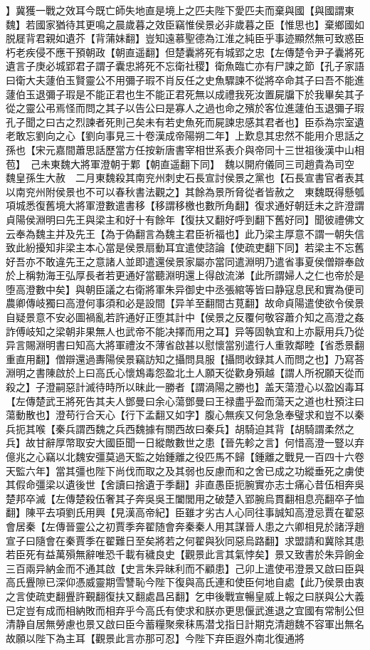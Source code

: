 】冀獲一戰之效耳今既亡師失地直是境上之匹夫陛下愛匹夫而棄與國【與國謂東魏】若國家猶待其更鳴之晨歲暮之效臣竊惟侯景必非歲暮之臣【惟思也】棄鄉國如脱屣背君親如遺芥【背蒲妹翻】豈知遠慕聖德為江淮之純臣乎事迹顯然無可致惑臣朽老疾侵不應干預朝政【朝直遥翻】但楚囊將死有城郢之忠【左傳楚令尹子囊將死遺言子庚必城郢君子謂子囊忠將死不忘衛社稷】衛魚臨亡亦有尸諫之節【孔子家語曰衛大夫蘧伯玉賢靈公不用彌子瑕不肖反任之史魚驟諫不從將卒命其子曰吾不能進蘧伯玉退彌子瑕是不能正君也生不能正君死無以成禮我死汝置屍牖下於我畢矣其子從之靈公弔焉怪而問之其子以告公曰是寡人之過也命之殯於客位進蘧伯玉退彌子瑕孔子聞之曰古之烈諫者死則己矣未有若史魚死而屍諫忠感其君者也】臣忝為宗室遺老敢忘劉向之心【劉向事見三十卷漢成帝陽朔二年】上歎息其忠然不能用介思話之孫也【宋元嘉間蕭思話歷當方任按新唐書宰相世系表介與帝同十三世祖後漢中山相苞】　己未東魏大將軍澄朝于鄴【朝直遥翻下同】　魏以開府儀同三司趙貴為司空　魏皇孫生大赦　二月東魏殺其南兖州刺史石長宣討侯景之黨也【石長宣書官者表其以南兖州附侯景也不可以春秋書法觀之】其餘為景所脅從者皆赦之　東魏既得懸瓠項城悉復舊境大將軍澄數遣書移【移謂移檄也數所角翻】復求通好朝廷未之許澄謂貞陽侯淵明曰先王與梁主和好十有餘年【復扶又翻好呼到翻下舊好同】聞彼禮佛文云奉為魏主并及先王【為于偽翻言為魏主君臣祈福也】此乃梁主厚意不謂一朝失信致此紛擾知非梁主本心當是侯景扇動耳宜遣使諮論【使疏吏翻下同】若梁主不忘舊好吾亦不敢違先王之意諸人並即遣還侯景家屬亦當同遣淵明乃遣省事夏侯僧辯奉啟於上稱勃海王弘厚長者若更通好當聽淵明還上得啟流涕【此所謂婦人之仁也帝於是堕高澄數中矣】與朝臣議之右衛將軍朱异御史中丞張綰等皆曰静寇息民和實為便司農卿傳岐獨曰高澄何事須和必是設間【异羊至翻間古莧翻】故命貞陽遣使欲令侯景自疑景意不安必圖禍亂若許通好正堕其計中【侯景之反覆何敬容蕭介知之高澄之姦詐傅岐知之梁朝非果無人也武帝不能决擇而用之耳】异等固執宜和上亦厭用兵乃從异言賜淵明書曰知高大將軍禮汝不薄省啟甚以慰懷當别遣行人重敦鄰睦【省悉景翻重直用翻】僧辯還過夀陽侯景竊訪知之攝問具服【攝問收録其人而問之也】乃寫荅淵明之書陳啟於上曰高氏心懷鴆毒怨盈北土人願天從歡身殞越【謂人所祝願天從而殺之】子澄嗣惡計滅待時所以昧此一勝者【謂渦陽之勝也】盖天蕩澄心以盈凶毒耳【左傳楚武王將死告其夫人鄧曼曰余心蕩鄧曼曰王禄盡乎盈而蕩天之道也杜預注曰蕩動散也】澄苟行合天心【行下孟翻又如字】腹心無疾又何急急奉璧求和豈不以秦兵扼其喉【秦兵謂西魏之兵西魏據有關西故曰秦兵】胡騎迫其背【胡騎謂柔然之兵】故甘辭厚幣取安大國臣聞一日縱敵數世之患【晉先軫之言】何惜高澄一豎以弃億兆之心竊以北魏安彊莫過天監之始鍾離之役匹馬不歸【鍾離之戰見一百四十六卷天監六年】當其彊也陛下尚伐而取之及其弱也反慮而和之舍已成之功縱垂死之虜使其假命彊梁以遺後世【舍讀曰捨遺于季翻】非直愚臣扼腕實亦志士痛心昔伍相奔吳楚邦卒滅【左傳楚殺伍奢其子奔吳吳王闔閭用之破楚入郢腕烏貫翻相息亮翻卒子恤翻】陳平去項劉氏用興【見漢高帝紀】臣雖才劣古人心同往事誠知高澄忌賈在翟惡會居秦【左傳晉靈公之初賈季奔翟随會奔秦秦人用其謀晉人患之六卿相見於諸浮趙宣子曰隨會在秦賈季在翟難日至矣將若之何翟與狄同惡烏路翻】求盟請和冀除其患若臣死有益萬殞無辭唯恐千載有穢良史【觀景此言其氣悖矣】景又致書於朱异餉金三百兩异納金而不通其啟【史言朱异昧利而不顧患】己卯上遣使弔澄景又啟曰臣與高氏舋隙已深仰憑威靈期雪讐恥今陛下復與高氏連和使臣何地自處【此乃侯景由衷之言使疏吏翻舋許覲翻復扶又翻處昌呂翻】乞申後戰宣暢皇威上報之曰朕與公大義已定豈有成而相納敗而相弃乎今高氏有使求和朕亦更思偃武進退之宜國有常制公但清静自居無勞慮也景又啟曰臣今蓄糧聚衆秣馬潜戈指日計期克清趙魏不容軍出無名故願以陛下為主耳【觀景此言亦那可忍】今陛下弃臣遐外南北復通將